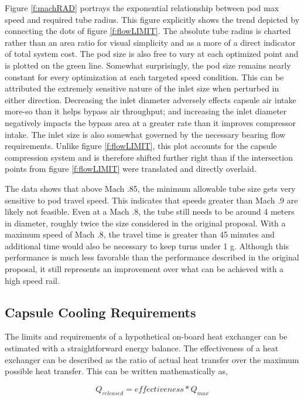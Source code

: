 \documentclass[heading.tex]{subfiles}
\begin{document}
Figure \ref{f:machRAD} portrays the exponential relationship between pod max speed and required tube radius. This figure explicitly shows the trend depicted by
connecting the dots of figure \ref{f:flowLIMIT}. The absolute tube radius is charted rather than an area ratio for visual simplicity and as a more of a direct indicator of total
system cost. The pod size is also free to vary at each optimized point and is plotted on the green line. Somewhat surprisingly, the pod size remains
nearly constant for every optimization at each targeted speed condition. This can be attributed the extremely sensitive nature of the inlet
size when perturbed in either direction. Decreasing the inlet diameter adversely effects capsule air intake more-so than it helps bypass air throughput; and
increasing the inlet diameter negatively impacts the bypass area at a greater rate than it improves compressor intake. The inlet size is also somewhat governed by the
necessary bearing flow requirements. Unlike figure \ref{f:flowLIMIT}, this plot accounts for
the capsule compression system and is therefore shifted further right than if the intersection points from figure \ref{f:flowLIMIT} were translated and directly
overlaid. 

The data shows that above Mach .85, the minimum allowable tube size gets very sensitive to pod travel speed. This indicates that speeds greater than Mach
.9 are likely not feasible. Even at a Mach .8, the tube still needs to be around 4 meters in diameter, roughly
twice the size considered in the original proposal. With a maximum speed of Mach .8, the travel time is greater than 45 minutes and additional time would also
be necessary to keep turns under 1 g. Although this performance is much less favorable than the performance
described in the original proposal, it still represents an improvement over what can be achieved with a high speed rail.

\subsection{Capsule Cooling Requirements}


The limits and requirements of a hypothetical on-board heat exchanger can be estimated with a straightforward energy balance. The
effectiveness of a heat exchanger can be described as the ratio of actual heat transfer over the maximum possible heat transfer. This can
be written mathematically as,

\begin{equation*}
{Q}_{released}  = effectiveness * {Q}_{max}
\end{equation*}
\end{document}
